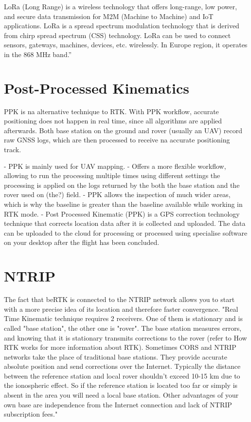 LoRa (Long Range) is a wireless technology that offers long-range, low power, and secure data transmission for M2M (Machine to Machine) and IoT applications. LoRa is a spread spectrum modulation technology that is derived from chirp spread spectrum (CSS) technology. LoRa can be used to connect sensors, gateways, machines, devices, etc. wirelessly. In Europe region, it operates in the 868 MHz band.'' %

\section{Post-Processed Kinematics}\label{sec:II_ppk}

PPK is na alternative technique to RTK. With PPK workflow, accurate positioning does not happen in real time, since all algorithms are applied afterwards. Both base station on the ground and rover (usually an UAV) record raw GNSS logs, which are then processed to receive na accurate positioning track.

- PPK is mainly used for UAV mapping.
- Offers a more flexible workflow, allowing to run the processing multiple times using different settings the processing is applied on the logs returned by the both the base station and the rover used on (the?) field.
- PPK allows the inspection of much wider areas, which is why the baseline is greater than the baseline available while working in RTK mode.
- Post Processed Kinematic (PPK) is a GPS correction technology technique that corrects location data after it is collected and uploaded. The data can be uploaded to the cloud for processing or processed using specialise software on your desktop after the flight has been concluded.

\section{NTRIP}\label{sec:II_ntrip}

The fact that beRTK is connected to the NTRIP network allows you to start with a more precise idea of its location and therefore faster convergence.
"Real Time Kinematic technique requires 2 receivers. One of them is stationary and is called "base station", the other one is "rover". The base station measures errors, and knowing that it is stationary transmits corrections to the rover (refer to How RTK works for more information about RTK). Sometimes CORS and NTRIP networks take the place of traditional base stations. They provide accurate absolute position and send corrections over the Internet. Typically the distance between the reference station and local rover shouldn't exceed 10-15 km due to the ionospheric effect. So if the reference station is located too far or simply is absent in the area you will need a local base station. Other advantages of your own base are independence from the Internet connection and lack of NTRIP subscription fees."


